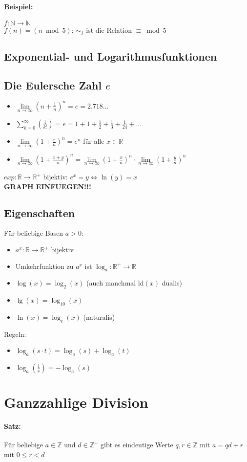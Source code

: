 \paragraph{Beispiel:}$f:\mathbb{N}\rightarrow\mathbb{N}$\\
$f(n)=(n \bmod 5)$: $\sim_f$ ist die Relation $\equiv \bmod 5$

\subsection{Exponential- und Logarithmusfunktionen}
\subsection{Die Eulersche Zahl $e$}
\begin{itemize}
\item $\lim\limits_{n \to \infty}\left(n+\frac{1}{n}\right)^n=e=2.718\ldots$
\item $\sum\limits_{k=0}^{\infty}\left(\frac{1}{k!}\right)=e=1+1+\frac{1}{2}+\frac{1}{3}+\frac{1}{24}+\ldots$
\item $\lim\limits_{n\to\infty}\left(1+\frac{x}{n}\right)^n=e^n$ für alle $x\in\mathbb{R}$
\item $\lim\limits_{n\to\infty}\left(1+\frac{x+y}{n}\right)^n=\lim\limits_{n\to\infty}\left(1+\frac{x}{n}\right)^n \cdot \lim\limits_{n\to\infty}\left(1+\frac{y}{n}\right)^n$
\end{itemize}
$exp: \mathbb{R}\to	\mathbb{R}^+$ bijektiv:
$e^x=y \Leftrightarrow \ln(y)=x$\\
\textbf{GRAPH EINFUEGEN!!!}

\subsection{Eigenschaften}
Für beliebige Basen $a>0$:
\begin{itemize}
\item $a^x:\mathbb{R}\to\mathbb{R}^+$ bijektiv
\item Umkehrfunktion zu $a^x$ ist $\log_a:\mathbb{R}^+\to\mathbb{R}$
\item $\log(x)=\log_2(x)$ (auch manchmal $\text{ld}(x)$ \glq dualis\grq )
\item $\lg(x)=\log_{10}(x)$
\item $\ln(x)=\log_e(x)$ (\glq naturalis\grq )
\end{itemize}
Regeln:
\begin{itemize}
\item $\log_a(s\cdot t) = \log_a(s) + \log_a(t)$
\item $\log_a\left(\frac{1}{s}\right)=-\log_a(s)$
\end{itemize}

\section{Ganzzahlige Division}
\paragraph{Satz:}Für beliebige $a\in\mathbb{Z}$ und $d\in\mathbb{Z}^+$ gibt es eindeutige Werte $q,r\in\mathbb{Z}$ mit $a=qd+r$ mit $0\leq r<d$
%